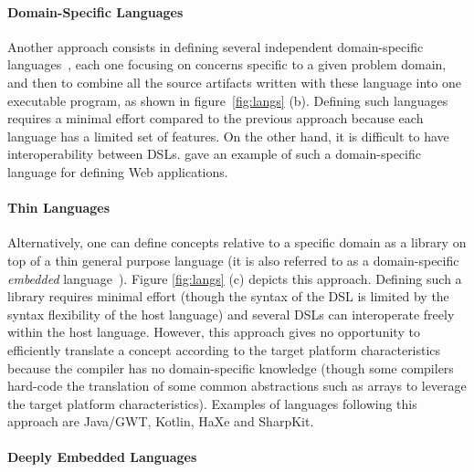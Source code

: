 \documentclass[preprint]{sigplanconf}
\begin{document}
\paragraph{Domain-Specific Languages}


Another approach consists in defining several independent domain-specific
languages~\cite{Van00_DSL}, each one focusing on concerns specific to a given problem domain, and
then to combine all the source artifacts written with these language into one executable program, as
shown in figure~\ref{fig:langs} (b). Defining such languages requires a minimal effort compared to
the previous approach because each language has a limited set of features. On the other hand, it is
difficult to have interoperability between DSLs. \cite{Groenewegen08_WebDSL} gave an example of such
a domain-specific language for defining Web applications.

\paragraph{Thin Languages}

\enlargethispage{0.3cm}


Alternatively, one can define concepts relative to a specific domain as a library on top of a thin
general purpose language (it is also referred to as a domain-specific \emph{embedded}
language~\cite{Hudak96_DSEL}). Figure \ref{fig:langs} (c) depicts this approach. Defining such a
library requires minimal effort (though the syntax of the DSL is limited by the syntax flexibility
of the host language) and several DSLs can interoperate freely within the host language. However,
this approach gives no opportunity to efficiently translate a concept according to the target
platform characteristics because the compiler has no domain-specific knowledge (though some
compilers hard-code the translation of some common abstractions such as arrays to leverage the
target platform characteristics). Examples of languages following this approach are Java/GWT,
Kotlin, HaXe and SharpKit.

\paragraph{Deeply Embedded Languages}
\end{document}
